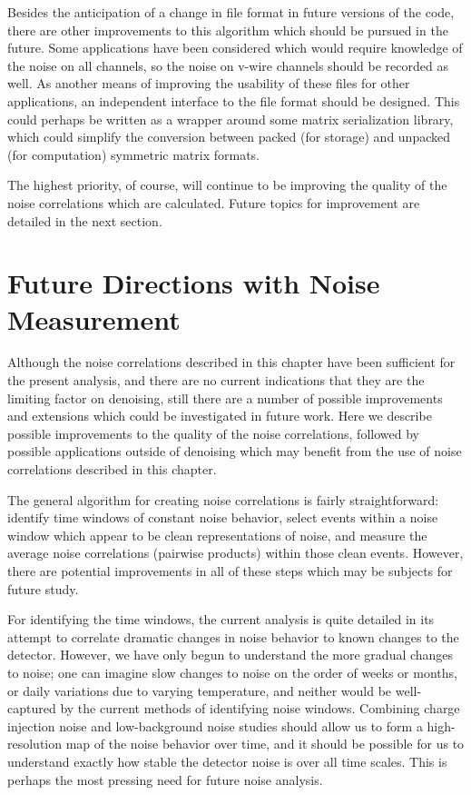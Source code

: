 Besides the anticipation of a change in file format in future versions of the code, there are other improvements to this algorithm which should be pursued in the future.  Some applications have been considered which would require knowledge of the noise on all channels, so the noise on v-wire channels should be recorded as well.  As another means of improving the usability of these files for other applications, an independent interface to the file format should be designed.  This could perhaps be written as a wrapper around some matrix serialization library, which could simplify the conversion between packed (for storage) and unpacked (for computation) symmetric matrix formats.

The highest priority, of course, will continue to be improving the quality of the noise correlations which are calculated.  Future topics for improvement are detailed in the next section.

\section{Future Directions with Noise Measurement}\label{sec:NoiseCorrelationsFuture}

Although the noise correlations described in this chapter have been sufficient for the present analysis, and there are no current indications that they are the limiting factor on denoising, still there are a number of possible improvements and extensions which could be investigated in future work.  Here we describe possible improvements to the quality of the noise correlations, followed by possible applications outside of denoising which may benefit from the use of noise correlations described in this chapter.

The general algorithm for creating noise correlations is fairly straightforward: identify time windows of constant noise behavior, select events within a noise window which appear to be clean representations of noise, and measure the average noise correlations (pairwise products) within those clean events.  However, there are potential improvements in all of these steps which may be subjects for future study.

For identifying the time windows, the current analysis is quite detailed in its attempt to correlate dramatic changes in noise behavior to known changes to the detector.  However, we have only begun to understand the more gradual changes to noise; one can imagine slow changes to noise on the order of weeks or months, or daily variations due to varying temperature, and neither would be well-captured by the current methods of identifying noise windows.  Combining charge injection noise and low-background noise studies should allow us to form a high-resolution map of the noise behavior over time, and it should be possible for us to understand exactly how stable the detector noise is over all time scales.  This is perhaps the most pressing need for future noise analysis.

